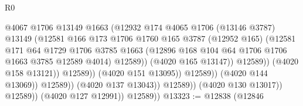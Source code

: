 \begin{lexlean}{R0}
\begin{coremodule}
                                            @4067
                                            @1706
                                            @13149
                                            @1663
                                            (@12932
                                              @174
                                              @4065
                                              @1706
                                              (@13146 @3787)
                                              @13149
                                              (@12581
                                                @166
                                                @173
                                                @1706
                                                @1760
                                                @165
                                                @3787
                                                (@12952 @165)
                                                (@12581
                                                  @171
                                                  @64
                                                  @1729
                                                  @1706
                                                  @3785
                                                  @1663
                                                  (@12896
                                                    @168
                                                    @104
                                                    @64
                                                    @1706
                                                    @1706
                                                    @1663
                                                    @3785
                                                    @12589
                                                    @4014)
                                                  @12589))
                                              (@4020 @165 @13147))
                                            @12589))
                                        (@4020 @158 @13121))
                                      @12589))
                                  (@4020 @151 @13095))
                                @12589))
                            (@4020 @144 @13069))
                          @12589))
                      (@4020 @137 @13043))
                    @12589))
                (@4020 @130 @13017))
              @12589))
          (@4020 @127 @12991))
        @12589))
@13323 := @12838
    (@12846

\end{coremodule}
\end{lexlean}
